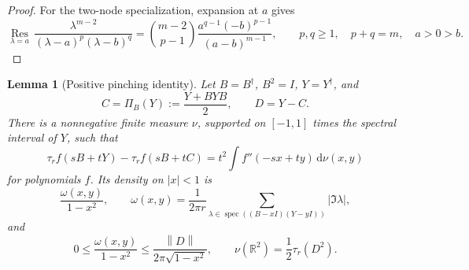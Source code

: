 \documentclass[11pt]{amsart}
\newtheorem{lemma}[theorem]{Lemma}
\theoremstyle{remark}
\theoremstyle{plain}
\numberwithin{equation}{section}
\DeclareMathOperator{\spec}{spec}
\newcommand{\R}{\mathbb R}
\newcommand{\dd}{\,\mathrm d}
\newcommand{\norm}[1]{\left\|#1\right\|}
\begin{document}
\begin{proof}
For the two-node specialization, expansion at \(a\) gives
\begin{equation}\label{eq:twonoderesidue}
 \underset{\lambda=a}{\operatorname{Res}}\,
 \frac{\lambda^{m-2}}{(\lambda-a)^p(\lambda-b)^q}
 =
 \binom{m-2}{p-1}
 \frac{a^{q-1}(-b)^{p-1}}{(a-b)^{m-1}},
 \qquad p,q\ge1,\quad p+q=m,\quad a>0>b.
\end{equation}
\end{proof}

\begin{lemma}[Positive pinching identity]\label{lem:pinching}
Let \(B=B^\dagger\), \(B^2=I\), \(Y=Y^\dagger\), and
\[
 C=\Pi_B(Y):=\frac{Y+BYB}{2},\qquad D=Y-C.
\]
There is a nonnegative finite measure \(\nu\), supported on
\([-1,1]\) times the spectral interval of \(Y\), such that
\begin{equation}\label{eq:pinching}
 \tau_r f(sB+tY)-\tau_r f(sB+tC)
 =t^2\int f''(-sx+ty)\dd\nu(x,y)
\end{equation}
for polynomials \(f\). Its density on \(|x|<1\) is
\begin{equation}\label{eq:nudensity}
 \frac{\omega(x,y)}{1-x^2},\qquad
 \omega(x,y)=\frac1{2\pi r}
 \sum_{\lambda\in\spec((B-xI)(Y-yI))}|\Im\lambda|,
\end{equation}
and
\begin{equation}\label{eq:numajorant}
 0\le\frac{\omega(x,y)}{1-x^2}
 \le\frac{\norm D}{2\pi\sqrt{1-x^2}},\qquad
 \nu(\R^2)=\frac12\tau_r(D^2).
\end{equation}
\end{lemma}
\end{document}
